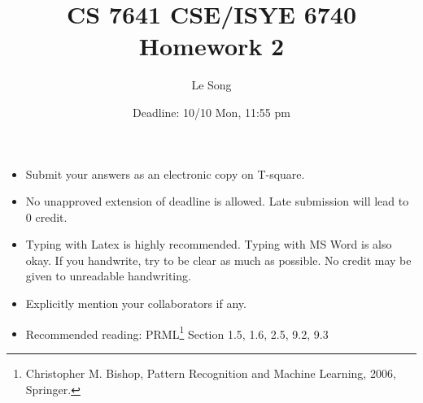 \documentclass[twoside,10pt]{article}
\begin{document}
\title{CS 7641 CSE/ISYE 6740 Homework 2}
\author{Le Song}
\date{Deadline: 10/10 Mon, 11:55 pm
} \maketitle

\begin{itemize}
  \item Submit your answers as an electronic copy on T-square.
  \item No unapproved extension of deadline is allowed. Late
  submission will lead to 0 credit.
  \item Typing with Latex is highly recommended. Typing with MS Word is also okay.
  If you handwrite, try to be clear as much as possible. No credit may be given to unreadable handwriting.
  \item Explicitly mention your collaborators if any.
  \item Recommended reading: PRML\footnote{Christopher M. Bishop, Pattern Recognition and Machine
Learning, 2006, Springer.} Section 1.5, 1.6, 2.5, 9.2, 9.3

\end{itemize}
\end{document}

